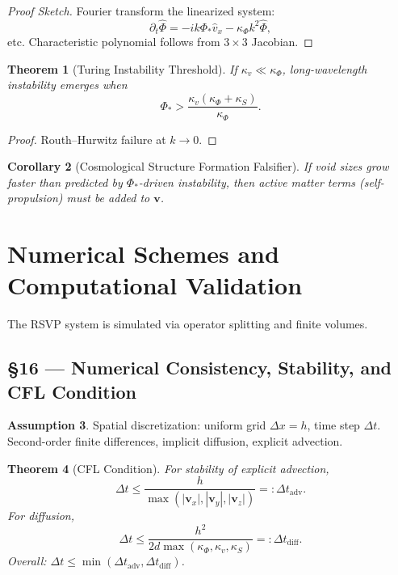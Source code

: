 \documentclass[11pt]{article}
\newtheorem{theorem}{Theorem}[section]
\newtheorem{corollary}[theorem]{Corollary}
\theoremstyle{definition}
\newtheorem{assumption}[theorem]{Assumption}
\theoremstyle{remark}
\newcommand{\vect}[1]{\bm{#1}}
\begin{document}
\begin{proof}[Proof Sketch]
Fourier transform the linearized system:
\[
\partial_t \hat{\Phi} = -i k \Phi_* \hat{v}_x - \kappa_\Phi k^2 \hat{\Phi},
\]
etc. Characteristic polynomial follows from $3\times3$ Jacobian.
\end{proof}

\begin{theorem}[Turing Instability Threshold]
If $\kappa_v \ll \kappa_\Phi$, long-wavelength instability emerges when
\[
\Phi_* > \frac{\kappa_v (\kappa_\Phi + \kappa_S)}{\kappa_\Phi}.
\]
\end{theorem}

\begin{proof}
Routh--Hurwitz failure at $k \to 0$.
\end{proof}

\begin{corollary}[Cosmological Structure Formation Falsifier]
If void sizes grow faster than predicted by $\Phi_*$-driven instability, then active matter terms (self-propulsion) must be added to $\vect{v}$.
\end{corollary}

\section{Numerical Schemes and Computational Validation}
The RSVP system is simulated via operator splitting and finite volumes.

\subsection*{§16 — Numerical Consistency, Stability, and CFL Condition}

\begin{assumption}
\label{ass:num}
Spatial discretization: uniform grid $\Delta x = h$, time step $\Delta t$. Second-order finite differences, implicit diffusion, explicit advection.
\end{assumption}

\begin{theorem}[CFL Condition]
For stability of explicit advection,
\[
\Delta t \le \frac{h}{\max(|\vect{v}_x|,|\vect{v}_y|,|\vect{v}_z|)} =: \Delta t_{\mathrm{adv}}.
\]
For diffusion,
\[
\Delta t \le \frac{h^2}{2d \max(\kappa_\Phi,\kappa_v,\kappa_S)} =: \Delta t_{\mathrm{diff}}.
\]
Overall: $\Delta t \le \min(\Delta t_{\mathrm{adv}}, \Delta t_{\mathrm{diff}})$.
\end{theorem}
\end{document}
